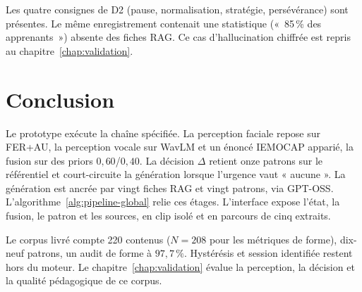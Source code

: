 Les quatre consignes de D2 (pause, normalisation, stratégie,
persévérance) sont présentes. Le même enregistrement contenait une
statistique («~85\,\% des apprenants~») absente des fiches RAG. Ce
cas d'hallucination chiffrée est repris au
chapitre~\ref{chap:validation}.

\section{Conclusion}
\label{sec:ch4-concl}

Le prototype exécute la chaîne spécifiée. La perception faciale
repose sur FER+AU, la perception vocale sur WavLM et un énoncé
\textsc{IEMOCAP} apparié, la fusion sur des priors $0{,}60$/$0{,}40$.
La décision $\Delta$ retient onze patrons sur le référentiel et
court-circuite la génération lorsque l'urgence vaut « aucune ».
La génération est ancrée par vingt fiches RAG et vingt patrons,
via \textsc{GPT-OSS}. L'algorithme~\ref{alg:pipeline-global} relie
ces étages. L'interface expose l'état, la fusion, le patron et les
sources, en clip isolé et en parcours de cinq extraits.

Le corpus livré compte 220 contenus ($N=208$ pour les métriques de
forme), dix-neuf patrons, un audit de forme à $97{,}7\,\%$.
Hystérésis et session identifiée restent hors du moteur. Le
chapitre~\ref{chap:validation} évalue la perception, la décision et
la qualité pédagogique de ce corpus.
